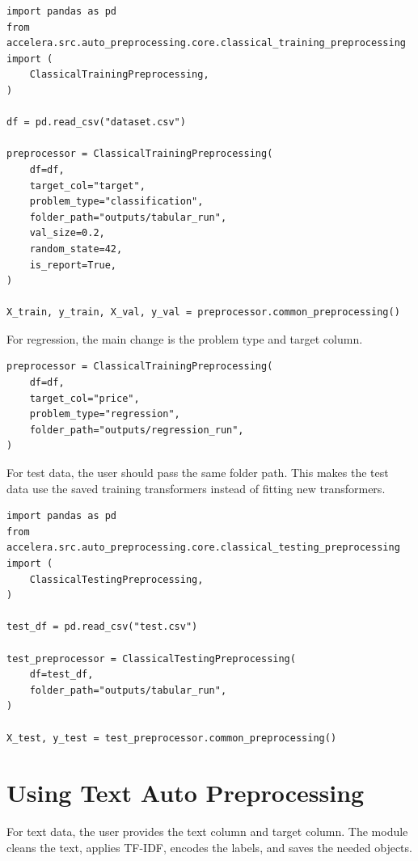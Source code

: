 \documentclass[12pt,a4paper,oneside]{report}
\begin{document}
\begin{lstlisting}[style=code,caption={Calling tabular training preprocessing}]
import pandas as pd
from accelera.src.auto_preprocessing.core.classical_training_preprocessing import (
    ClassicalTrainingPreprocessing,
)

df = pd.read_csv("dataset.csv")

preprocessor = ClassicalTrainingPreprocessing(
    df=df,
    target_col="target",
    problem_type="classification",
    folder_path="outputs/tabular_run",
    val_size=0.2,
    random_state=42,
    is_report=True,
)

X_train, y_train, X_val, y_val = preprocessor.common_preprocessing()
\end{lstlisting}

\noindent For regression, the main change is the problem type and target column.

\begin{lstlisting}[style=code,caption={Calling tabular regression preprocessing}]
preprocessor = ClassicalTrainingPreprocessing(
    df=df,
    target_col="price",
    problem_type="regression",
    folder_path="outputs/regression_run",
)
\end{lstlisting}

\noindent For test data, the user should pass the same folder path. This makes the test
data use the saved training transformers instead of fitting new transformers.

\begin{lstlisting}[style=code,caption={Calling tabular testing preprocessing}]
import pandas as pd
from accelera.src.auto_preprocessing.core.classical_testing_preprocessing import (
    ClassicalTestingPreprocessing,
)

test_df = pd.read_csv("test.csv")

test_preprocessor = ClassicalTestingPreprocessing(
    df=test_df,
    folder_path="outputs/tabular_run",
)

X_test, y_test = test_preprocessor.common_preprocessing()
\end{lstlisting}

\section{Using Text Auto Preprocessing}

For text data, the user provides the text column and target column. The module
cleans the text, applies TF-IDF, encodes the labels, and saves the needed
objects.
\end{document}

